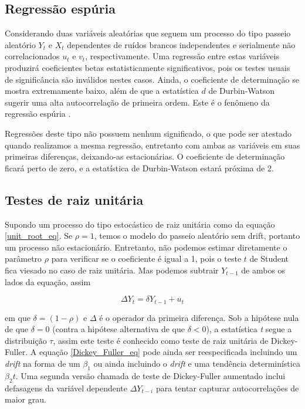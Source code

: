 \documentclass[twocolumn]{rbef}
\newcommand{\1}{\mathbbm{1}}
\begin{document}
\subsection{Regressão espúria} \label{spurious}

Considerando duas variáveis aleatórias que seguem um processo do tipo passeio aleatório $Y_{t}$ e $X_{t}$ dependentes de ruídos brancos independentes e serialmente não correlacionados $u_{t}$ e $v_{t}$, respectivamente. Uma regressão entre estas variáveis produzirá coeficientes betas estatisticamente significativos, pois os testes usuais de significância são inválidos nestes casos\cite{Granger-Newbold}. Ainda, o coeficiente de determinação se mostra extremamente baixo, além de que a estatística $d$ de Durbin-Watson sugerir uma alta autocorrelação de primeira ordem\cite{Greene}. Este é o fenômeno da regressão espúria \cite{Yule}.

Regressões deste tipo não possuem nenhum significado, o que pode ser atestado quando realizamos a mesma regressão, entretanto com ambas as variáveis em suas primeiras diferenças, deixando-as estacionárias. O coeficiente de determinação ficará perto de zero, e a estatística de Durbin-Watson estará próxima de 2.

\subsection{Testes de raiz unitária} \label{unit_root}

Supondo um processo do tipo estocástico de raiz unitária como da equação \ref{unit_root_eq}. Se $\rho = 1$, temos o modelo do passeio aleatório sem drift, portanto um processo não estacionário. Entretanto, não podemos estimar diretamente o parâmetro $\rho$ para verificar se o coeficiente é igual a 1, pois o teste $t$ de Student fica viesado no caso de raiz unitária. Mas podemos subtrair $Y_{t-1}$ de ambos os lados da equação, assim

\begin{equation} \label{Dickey_Fuller_eq}
    \Delta Y_{t} = \delta Y_{t-1} + u_{t}
\end{equation}

em que $\delta = (1-\rho)$ e $\Delta$ é o operador da primeira diferença. Sob a hipótese nula de que $\delta = 0$ (contra a hipótese alternativa de que $\delta < 0$), a estatística \textit{t} segue a distribuição $\tau$\cite{Dicker-Fuller}, assim este teste é conhecido como teste de raiz unitária de Dickey-Fuller. A equação \ref{Dickey_Fuller_eq} pode ainda ser reespecificada incluindo um \textit{drift} na forma de um $\beta_{1}$ ou ainda incluindo o \textit{drift} e uma tendência determinística $\beta_{2}t$. Uma segunda versão chamada de teste de Dickey-Fuller aumentado inclui defasagens da variável dependente $\Delta Y_{t-i}$ para tentar capturar autocorrelações de maior grau.
\end{document}
